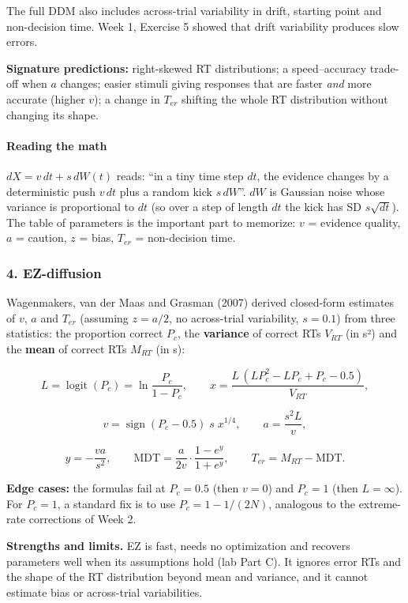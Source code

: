 The full DDM also includes across-trial variability in drift, starting
point and non-decision time. Week 1, Exercise 5 showed that drift
variability produces slow errors.

\textbf{Signature predictions:} right-skewed RT distributions; a
speed--accuracy trade-off when \(a\) changes; easier stimuli giving
responses that are faster \emph{and} more accurate (higher \(v\)); a
change in \(T_{er}\) shifting the whole RT distribution without changing
its shape.

\paragraph{Reading the math}

\(dX = v\,dt + s\,dW(t)\) reads: ``in a tiny time step \(dt\), the
evidence changes by a deterministic push \(v\,dt\) plus a random kick
\(s\,dW\)''. \(dW\) is Gaussian noise whose variance is proportional to
\(dt\) (so over a step of length \(dt\) the kick has SD \(s\sqrt{dt}\)).
The table of parameters is the important part to memorize: \(v\) =
evidence quality, \(a\) = caution, \(z\) = bias, \(T_{er}\) =
non-decision time.

\subsubsection{4. EZ-diffusion}

Wagenmakers, van der Maas and Grasman (2007) derived closed-form
estimates of \(v\), \(a\) and \(T_{er}\) (assuming \(z = a/2\), no
across-trial variability, \(s = 0.1\)) from three statistics: the
proportion correct \(P_c\), the \textbf{variance} of correct RTs
\(V_{RT}\) (in s²) and the \textbf{mean} of correct RTs \(M_{RT}\) (in
s):

\[
L = \operatorname{logit}(P_c) = \ln\frac{P_c}{1 - P_c}, \qquad
x = \frac{L\,(L P_c^2 - L P_c + P_c - 0.5)}{V_{RT}},
\]

\[
v = \operatorname{sign}(P_c - 0.5)\; s\; x^{1/4}, \qquad
a = \frac{s^2 L}{v},
\]

\[
y = -\frac{v a}{s^2}, \qquad
\mathrm{MDT} = \frac{a}{2v}\cdot\frac{1 - e^{y}}{1 + e^{y}}, \qquad
T_{er} = M_{RT} - \mathrm{MDT}.
\]

\textbf{Edge cases:} the formulas fail at \(P_c = 0.5\) (then \(v = 0\))
and \(P_c = 1\) (then \(L = \infty\)). For \(P_c = 1\), a standard fix
is to use \(P_c = 1 - 1/(2N)\), analogous to the extreme-rate
corrections of Week 2.

\textbf{Strengths and limits.} EZ is fast, needs no optimization and
recovers parameters well when its assumptions hold (lab Part C). It
ignores error RTs and the shape of the RT distribution beyond mean and
variance, and it cannot estimate bias or across-trial variabilities.

